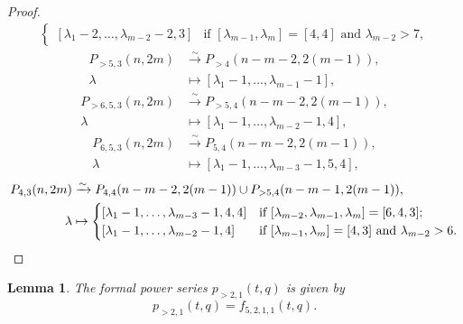 \documentclass[a4paper, 12pt, reqno]{amsart}
\newtheorem{lemma}[theorem]{Lemma}
\theoremstyle{remark}
\numberwithin{equation}{subsection}
\begin{document}
\begin{proof}
\begin{align*}
\begin{cases}
                [\lambda_1 - 2, \dots, \lambda_{m - 2} - 2, 3] &\text{if }[\lambda_{m - 1}, \lambda_m] = [4, 4]\text{ and }\lambda_{m - 2} > 7,
              \end{cases}
  \end{align*}
  \begin{align*}
    P_{>5, 3}(n, 2m) &\xrightarrow{\sim} P_{>4}(n - m - 2, 2(m - 1)), \\
    \lambda &\mapsto [\lambda_1 - 1, \dots, \lambda_{m - 1} - 1],
  \end{align*}
  \begin{align*}
    P_{>6, 5, 3}(n, 2m) &\xrightarrow{\sim} P_{>5, 4}(n - m - 2, 2(m - 1)), \\
    \lambda &\mapsto [\lambda_1 - 1, \dots, \lambda_{m - 2} - 1, 4],
  \end{align*}
  \begin{align*}
    P_{6, 5, 3}(n, 2m) &\xrightarrow{\sim} P_{5, 4}(n - m - 2, 2(m - 1)), \\
    \lambda &\mapsto [\lambda_1 - 1, \dots, \lambda_{m - 3} - 1, 5, 4],
  \end{align*}
  \begin{align*}
    P_{4, 3}(n, 2m) &\xrightarrow{\sim} P_{4, 4}(n - m - 2, 2(m - 1)) \cup P_{>5, 4}(n - m - 1, 2(m - 1)), \\
    \lambda &\mapsto
              \begin{cases}
                [\lambda_1 - 1, \dots, \lambda_{m - 3} - 1, 4, 4] &\text{if }[\lambda_{m - 2}, \lambda_{m - 1}, \lambda_m] = [6, 4, 3]; \\
                [\lambda_1 - 1, \dots, \lambda_{m - 2} - 1, 4] &\text{if }[\lambda_{m - 1}, \lambda_m] = [4, 3]\text{ and }\lambda_{m - 2} > 6. \qedhere
              \end{cases}
  \end{align*}
\end{proof}

\begin{lemma}
  \label{lmm:22}
  The formal power series $p_{>2, 1}(t, q)$ is given by
  \begin{equation*}
    p_{>2, 1}(t, q) = f_{5, 2, 1, 1}(t, q).
  \end{equation*}
\end{lemma}
\end{document}
